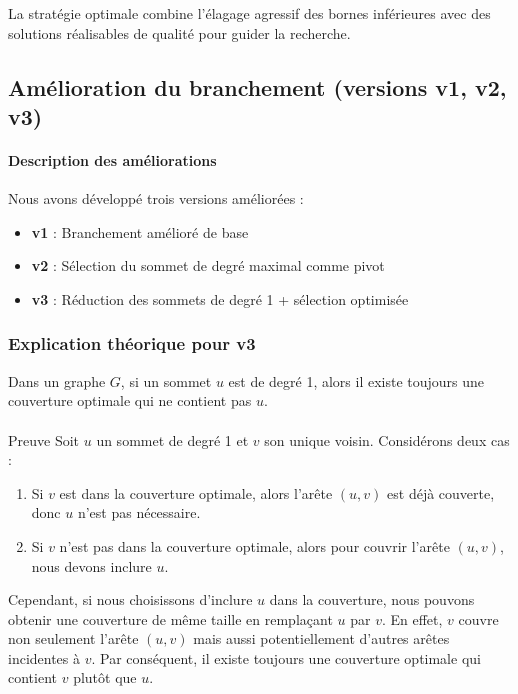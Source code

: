 \documentclass[11pt,a4paper]{article}
\begin{document}
La stratégie optimale combine l'élagage agressif des bornes inférieures avec des solutions réalisables de qualité pour guider la recherche.

\subsection{Amélioration du branchement (versions v1, v2, v3)}

\paragraph{Description des améliorations}
Nous avons développé trois versions améliorées :
\begin{itemize}
  \item \textbf{v1} : Branchement amélioré de base
  \item \textbf{v2} : Sélection du sommet de degré maximal comme pivot
  \item \textbf{v3} : Réduction des sommets de degré 1 + sélection optimisée
\end{itemize}

\subsubsection{Explication théorique pour v3}

Dans un graphe $G$, si un sommet $u$ est de degré 1, alors il existe toujours une couverture optimale qui ne contient pas $u$.

\paragraph{}{Preuve}
Soit $u$ un sommet de degré 1 et $v$ son unique voisin. Considérons deux cas :

\begin{enumerate}
    \item Si $v$ est dans la couverture optimale, alors l'arête $(u,v)$ est déjà couverte, donc $u$ n'est pas nécessaire.
    
    \item Si $v$ n'est pas dans la couverture optimale, alors pour couvrir l'arête $(u,v)$, nous devons inclure $u$.
\end{enumerate}

Cependant, si nous choisissons d'inclure $u$ dans la couverture, nous pouvons obtenir une couverture de même taille en remplaçant $u$ par $v$. En effet, $v$ couvre non seulement l'arête $(u,v)$ mais aussi potentiellement d'autres arêtes incidentes à $v$. Par conséquent, il existe toujours une couverture optimale qui contient $v$ plutôt que $u$.
\end{document}

